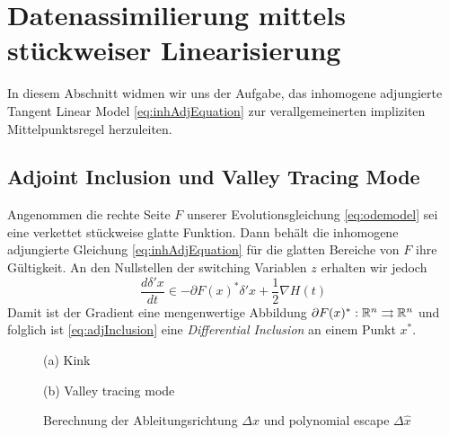 % 
\chapter{Datenassimilierung mittels stückweiser Linearisierung}
In diesem Abschnitt widmen wir uns der Aufgabe, das inhomogene adjungierte Tangent Linear Model \eqref{eq:inhAdjEquation} zur verallgemeinerten impliziten Mittelpunktsregel herzuleiten.

\section{Adjoint Inclusion und Valley Tracing Mode}
\label{sec:adjointInclusion}
Angenommen die rechte Seite $F$ unserer Evolutionsgleichung \eqref{eq:odemodel} sei eine verkettet stückweise glatte Funktion. Dann behält die inhomogene adjungierte Gleichung \eqref{eq:inhAdjEquation} für die glatten Bereiche von $F$ ihre Gültigkeit. An den Nullstellen der switching Variablen $z$ erhalten wir jedoch
\begin{equation}
 \label{eq:adjInclusion}
 \frac{d \delta' x}{dt} \in- \partial F(x)^*\delta'x + \frac{1}{2}\nabla H(t)
\end{equation}
Damit ist der Gradient eine mengenwertige Abbildung $\partial F(x)^*:\mathbb{R}^n\rightrightarrows \mathbb{R}^n$ und folglich ist \eqref{eq:adjInclusion} eine \textit{Differential Inclusion} an einem Punkt $x^*$.


\begin{figure}
\centering
\begin{minipage}[b]{0.49\linewidth}
\centering

\caption*{(a) Kink}
\end{minipage}
\begin{minipage}[b]{0.49\linewidth}
\centering

\caption*{(b) Valley tracing mode}
\end{minipage}
\caption{Berechnung der Ableitungsrichtung $\Delta x$ und polynomial escape $\Delta \hat x$ }
\label{fig:adjValleyTracing}
\end{figure}

